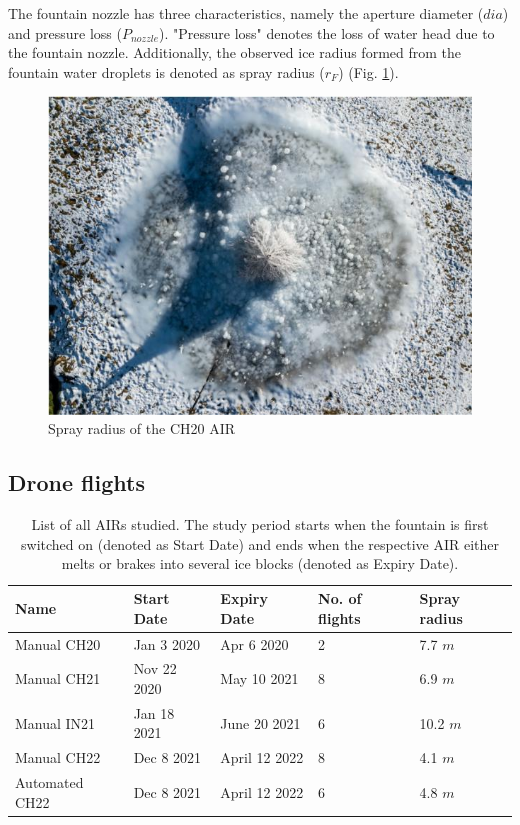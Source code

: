 The fountain nozzle has three characteristics, namely the aperture diameter ($dia$) and pressure loss
($P_{nozzle}$). "Pressure loss" denotes the loss of water head due to the fountain nozzle. Additionally,
the observed ice radius formed from the fountain water droplets is denoted as spray radius ($r_F$) (Fig.
\ref{fig:CH20_rad}).

\begin{figure}[htb]
	\centering
	\includegraphics[width=\textwidth/2]{figs/CH20_sprayrad.jpg}
	\caption{Spray radius of the CH20 AIR }
	\label{fig:CH20_rad}
\end{figure}

\subsection{Drone flights}

\begin{table}
	\centering
	\caption{List of all \ac{AIRs} studied. The study period starts when the fountain is first switched on
		(denoted as Start Date) and ends when the respective AIR either melts or brakes into several ice blocks
		(denoted as Expiry Date). }
	\label{tab:AIRs}
	\begin{tabular}{|lllll|}
		\hline
		\textbf{Name}    & \textbf{Start Date} & \textbf{Expiry Date} & \textbf{No. of flights} & \textbf{Spray
		radius}                                                                                                 \\ \hline
		Manual CH20 & Jan 3 2020          & Apr 6 2020           & 2                       & 7.7 $m$       \\
		Manual CH21 & Nov 22 2020         & May 10 2021          & 8                       & 6.9 $m$       \\
		Manual IN21 & Jan 18 2021         & June 20 2021         & 6                       & 10.2 $m$      \\
		Manual CH22 & Dec 8 2021          & April 12 2022        & 8                       & 4.1 $m$       \\
		Automated CH22   & Dec 8 2021          & April 12 2022        & 6                       & 4.8 $m$       \\ \hline
	\end{tabular}
\end{table}


